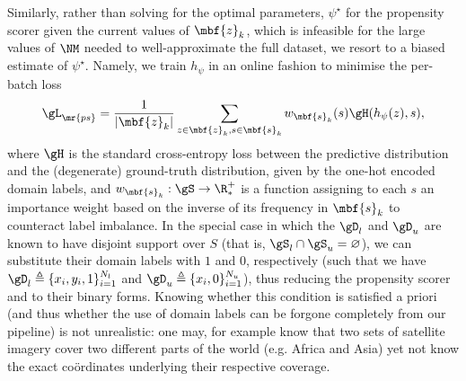 Similarly, rather than solving for the optimal parameters, $\psi^\star$ for the propensity scorer
given the current values of $\mbf{z}_k$, which is infeasible for the large values of $\NM$ needed
to well-approximate the full dataset, we resort to a biased estimate of $\psi^\star$.
%
Namely, we train $h_\psi$ in an online fashion to minimise the per-batch loss 
%
\begin{equation}
\gL_\mr{ps} = \frac{1}{|\mbf{z}_k|} \sum_{ z \in \mbf{z}_k, s \in \mbf{s}_k } w_{\mbf{s}_k}(s) \gH(h_{\psi}(z), s), 
\end{equation}
%
where $\gH$ is the standard cross-entropy loss between the predictive distribution and the
(degenerate) ground-truth distribution, given by the one-hot encoded domain labels, and
$w_{\mbf{s}_k}: \gS \to \R^+_*$ is a function assigning to each $s$ an importance weight
\citep{shimodaira2000improving} based on the inverse of its frequency in $\mbf{s}_k$ to counteract
label imbalance.
%
In the special case in which the $\gD_l$ and $\gD_u$ are known to have disjoint support over $S$
(that is, $\gS_l \cap \gS_u = \varnothing$), we can substitute their domain labels with $1$ and
$0$, respectively (such that we have $\gD_l \triangleq \{ x_i, y_i, 1 \}_{i=1}^{N_l}$ and $\gD_u
\triangleq \{x_i, 0 \}_{i=1}^{N_u}$), thus reducing the propensity scorer and \CNN{} to their
binary
forms. 
%
Knowing whether this condition is satisfied a priori (and thus whether the use of domain labels can
be forgone completely from our pipeline) is not unrealistic: one may, for example know that two
sets of satellite imagery cover two different parts of the world (e.g. Africa and Asia) yet not
know the exact co{\"o}rdinates underlying their respective coverage.

